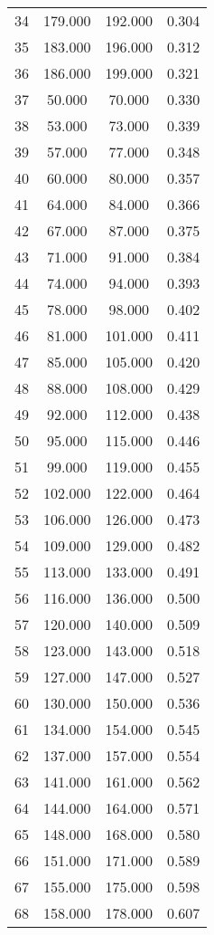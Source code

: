 \begin{tabular}{cccc}
  34 & 179.000 & 192.000 & 0.304 \\ 
  35 & 183.000 & 196.000 & 0.312 \\ 
  36 & 186.000 & 199.000 & 0.321 \\ 
  37 & 50.000 & 70.000 & 0.330 \\ 
  38 & 53.000 & 73.000 & 0.339 \\ 
  39 & 57.000 & 77.000 & 0.348 \\ 
  40 & 60.000 & 80.000 & 0.357 \\ 
  41 & 64.000 & 84.000 & 0.366 \\ 
  42 & 67.000 & 87.000 & 0.375 \\ 
  43 & 71.000 & 91.000 & 0.384 \\ 
  44 & 74.000 & 94.000 & 0.393 \\ 
  45 & 78.000 & 98.000 & 0.402 \\ 
  46 & 81.000 & 101.000 & 0.411 \\ 
  47 & 85.000 & 105.000 & 0.420 \\ 
  48 & 88.000 & 108.000 & 0.429 \\ 
  49 & 92.000 & 112.000 & 0.438 \\ 
  50 & 95.000 & 115.000 & 0.446 \\ 
  51 & 99.000 & 119.000 & 0.455 \\ 
  52 & 102.000 & 122.000 & 0.464 \\ 
  53 & 106.000 & 126.000 & 0.473 \\ 
  54 & 109.000 & 129.000 & 0.482 \\ 
  55 & 113.000 & 133.000 & 0.491 \\ 
  56 & 116.000 & 136.000 & 0.500 \\ 
  57 & 120.000 & 140.000 & 0.509 \\ 
  58 & 123.000 & 143.000 & 0.518 \\ 
  59 & 127.000 & 147.000 & 0.527 \\ 
  60 & 130.000 & 150.000 & 0.536 \\ 
  61 & 134.000 & 154.000 & 0.545 \\ 
  62 & 137.000 & 157.000 & 0.554 \\ 
  63 & 141.000 & 161.000 & 0.562 \\ 
  64 & 144.000 & 164.000 & 0.571 \\ 
  65 & 148.000 & 168.000 & 0.580 \\ 
  66 & 151.000 & 171.000 & 0.589 \\ 
  67 & 155.000 & 175.000 & 0.598 \\ 
  68 & 158.000 & 178.000 & 0.607 \\ 

\end{tabular}
